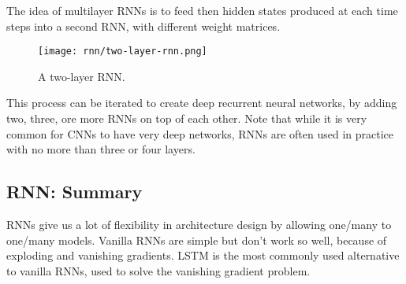 The idea of multilayer RNNs is to feed then hidden states produced at each time steps into a second RNN, with different weight matrices.
\begin{figure}[H]
    \centering
    \texttt{[image: rnn/two-layer-rnn.png]}
    \caption{A two-layer RNN.}
\end{figure}
This process can be iterated to create deep recurrent neural networks, by adding two, three, ore more RNNs on top of each other. Note that while it is very common for CNNs to have very deep networks, RNNs are often used in practice with no more than three or four layers.

\subsection*{RNN: Summary}
RNNs give us a lot of flexibility in architecture design by allowing one/many to one/many models. Vanilla RNNs are simple but don't work so well, because of exploding and vanishing gradients. LSTM is the most commonly used alternative to vanilla RNNs, used to solve the vanishing gradient problem.

